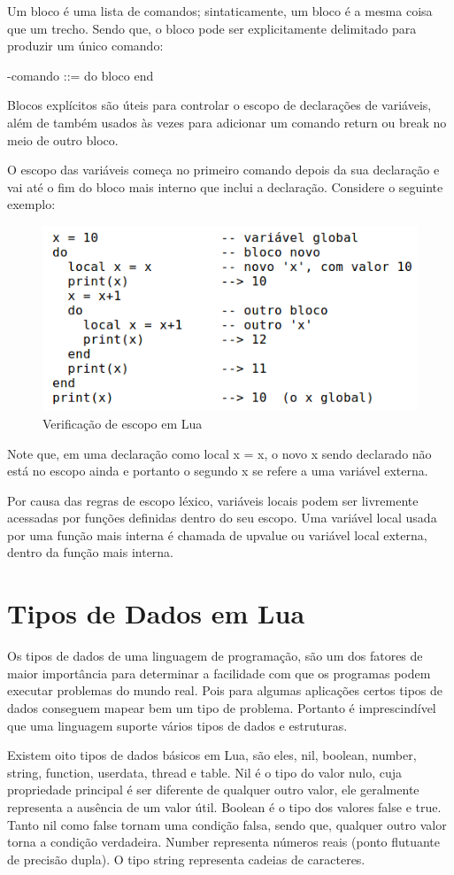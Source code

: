 \documentclass[
12pt, %
openright, %
oneside, %
a4paper, %
english, %
brazil, %
]{abntex2}
\begin{document}
Um bloco é uma lista de comandos; sintaticamente, um bloco é a mesma coisa que um trecho. Sendo que, o bloco pode ser explicitamente delimitado para produzir um único comando:

-comando ::= do bloco end

Blocos explícitos são úteis para controlar o escopo de declarações de variáveis, além de também usados às vezes para adicionar um comando return ou break no meio de outro bloco.

O escopo das variáveis começa no primeiro comando depois da sua declaração e vai até o fim do bloco mais interno que inclui a declaração. Considere o seguinte exemplo:

\begin{figure}[H]
\centering
\includegraphics[width=0.5\linewidth]{imagens/imagem3.png}
\caption{Verificação de escopo em Lua}
\end{figure}

Note que, em uma declaração como local x = x, o novo x sendo declarado não está no escopo ainda e portanto o segundo x se refere a uma variável externa.

Por causa das regras de escopo léxico, variáveis locais podem ser livremente acessadas por funções definidas dentro do seu escopo. Uma variável local usada por uma função mais interna é chamada de upvalue ou variável local externa, dentro da função mais interna.

\chapter{Tipos de Dados em Lua}
Os tipos de dados de uma linguagem de programação, são um dos fatores de maior importância para determinar a facilidade com que os programas podem executar problemas do mundo real. Pois para algumas aplicações certos tipos de dados conseguem mapear bem um tipo de problema. Portanto é imprescindível que uma linguagem suporte vários tipos de dados e estruturas.

Existem oito tipos de dados básicos em Lua, são eles, nil, boolean, number, string, function, userdata, thread e table. Nil é o tipo do valor nulo, cuja propriedade principal é ser diferente de qualquer outro valor, ele geralmente representa a ausência de um valor útil. Boolean é o tipo dos valores false e true. Tanto nil como false tornam uma condição falsa, sendo que, qualquer outro valor torna a condição verdadeira. Number representa números reais (ponto flutuante de precisão dupla). O tipo string representa cadeias de caracteres.
\end{document}
